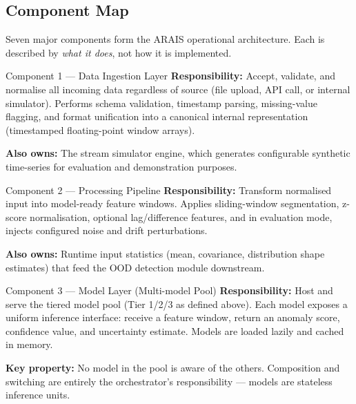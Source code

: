 \documentclass[11pt, a4paper]{article}
\begin{document}
\subsection{Component Map}

Seven major components form the ARAIS operational architecture.
Each is described by \textit{what it does}, not how it is implemented.

\vspace{6pt}

\begin{greenbox}{Component 1 — Data Ingestion Layer}
\textbf{Responsibility:} Accept, validate, and normalise all incoming data regardless of source
(file upload, API call, or internal simulator).
Performs schema validation, timestamp parsing, missing-value flagging,
and format unification into a canonical internal representation
(timestamped floating-point window arrays).

\textbf{Also owns:} The stream simulator engine, which generates configurable synthetic 
time-series for evaluation and demonstration purposes.
\end{greenbox}

\vspace{6pt}

\begin{infobox}{Component 2 — Processing Pipeline}
\textbf{Responsibility:} Transform normalised input into model-ready feature windows.
Applies sliding-window segmentation, z-score normalisation, 
optional lag/difference features, and in evaluation mode,
injects configured noise and drift perturbations.

\textbf{Also owns:} Runtime input statistics (mean, covariance, distribution shape estimates)
that feed the OOD detection module downstream.
\end{infobox}

\vspace{6pt}

\begin{redbox}{Component 3 — Model Layer (Multi-model Pool)}
\textbf{Responsibility:} Host and serve the tiered model pool (Tier 1/2/3 as defined above).
Each model exposes a uniform inference interface:
receive a feature window, return an anomaly score, confidence value,
and uncertainty estimate. Models are loaded lazily and cached in memory.

\textbf{Key property:} No model in the pool is aware of the others.
Composition and switching are entirely the orchestrator's responsibility —
models are stateless inference units.
\end{redbox}
\end{document}
